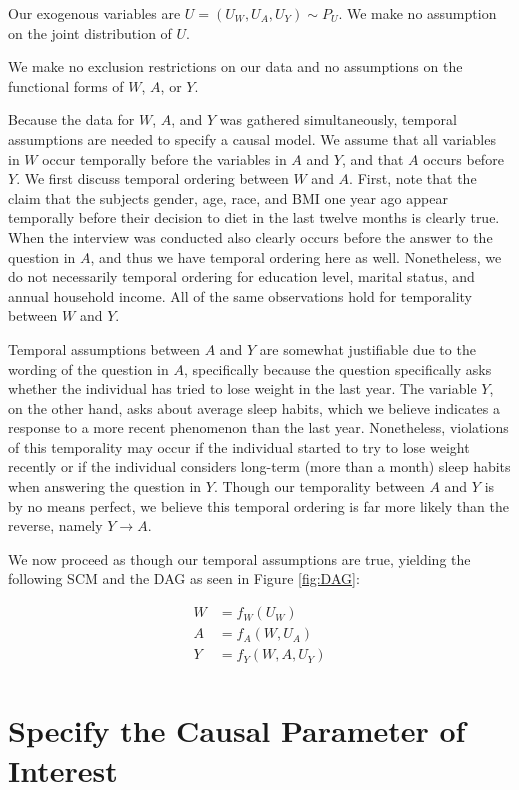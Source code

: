 \documentclass{article}
\begin{document}
Our exogenous variables are $U = (U_W, U_A, U_Y) \sim P_U$. We make no assumption on the joint distribution of $U$.  

We make no exclusion restrictions on our data and no assumptions on the functional forms of $W$, $A$, or $Y$.

Because the data for $W$, $A$, and $Y$ was gathered simultaneously, temporal assumptions are needed to specify a causal model. We assume that all variables in $W$ occur temporally before the variables in $A$ and $Y$, and that $A$ occurs before $Y$. We first discuss temporal ordering between $W$ and $A$. First, note that the claim that the subjects gender, age, race, and BMI one year ago appear temporally before their decision to diet in the last twelve months is clearly true. When the interview was conducted also clearly occurs before the answer to the question in $A$, and thus we have temporal ordering here as well. Nonetheless, we do not necessarily temporal ordering for education level, marital status, and annual household income. All of the same observations hold for temporality between $W$ and $Y$.

Temporal assumptions between $A$ and $Y$ are somewhat justifiable due to the wording of the question in $A$, specifically because the question specifically asks whether the individual has tried to lose weight in the last year. The variable $Y$, on the other hand, asks about average sleep habits, which we believe indicates a response to a more recent phenomenon than the last year. Nonetheless, violations of this temporality may occur if the individual started to try to lose weight recently or if the individual considers long-term (more than a month) sleep habits when answering the question in $Y$. Though our temporality between $A$ and $Y$ is by no means perfect, we believe this temporal ordering is far more likely than the reverse, namely $Y\rightarrow A$. 

We now proceed as though our temporal assumptions are true, yielding the following SCM and the DAG as seen in Figure \ref{fig:DAG}:

\begin{align*}
W &= f_{W}(U_{W}) \\
A &= f_{A}(W,U_{A}) \\
Y &= f_{Y}(W,A,U_{Y}) \\
\end{align*}


\section{Specify the Causal Parameter of Interest}
\end{document}
